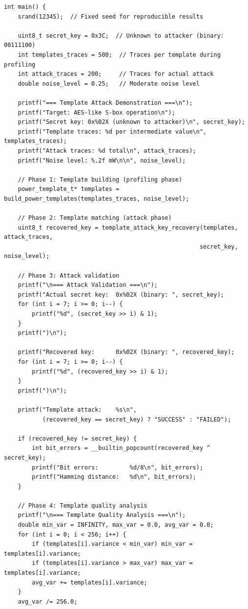 \documentclass[11pt,a4paper]{article}
\theoremstyle{definition}
\begin{document}
\begin{lstlisting}[caption={Complete Template Attack Demonstration}]
int main() {
    srand(12345);  // Fixed seed for reproducible results
    
    uint8_t secret_key = 0x3C;  // Unknown to attacker (binary: 00111100)
    int templates_traces = 500;  // Traces per template during profiling
    int attack_traces = 200;     // Traces for actual attack
    double noise_level = 0.25;   // Moderate noise level
    
    printf("=== Template Attack Demonstration ===\n");
    printf("Target: AES-like S-box operation\n");
    printf("Secret key: 0x%02X (unknown to attacker)\n", secret_key);
    printf("Template traces: %d per intermediate value\n", templates_traces);
    printf("Attack traces: %d total\n", attack_traces);
    printf("Noise level: %.2f mW\n\n", noise_level);
    
    // Phase 1: Template building (profiling phase)
    power_template_t* templates = build_power_templates(templates_traces, noise_level);
    
    // Phase 2: Template matching (attack phase)
    uint8_t recovered_key = template_attack_key_recovery(templates, attack_traces, 
                                                        secret_key, noise_level);
    
    // Phase 3: Attack validation
    printf("\n=== Attack Validation ===\n");
    printf("Actual secret key:  0x%02X (binary: ", secret_key);
    for (int i = 7; i >= 0; i--) {
        printf("%d", (secret_key >> i) & 1);
    }
    printf(")\n");
    
    printf("Recovered key:      0x%02X (binary: ", recovered_key);
    for (int i = 7; i >= 0; i--) {
        printf("%d", (recovered_key >> i) & 1);
    }
    printf(")\n");
    
    printf("Template attack:    %s\n", 
           (recovered_key == secret_key) ? "SUCCESS" : "FAILED");
    
    if (recovered_key != secret_key) {
        int bit_errors = __builtin_popcount(recovered_key ^ secret_key);
        printf("Bit errors:         %d/8\n", bit_errors);
        printf("Hamming distance:   %d\n", bit_errors);
    }
    
    // Phase 4: Template quality analysis
    printf("\n=== Template Quality Analysis ===\n");
    double min_var = INFINITY, max_var = 0.0, avg_var = 0.0;
    for (int i = 0; i < 256; i++) {
        if (templates[i].variance < min_var) min_var = templates[i].variance;
        if (templates[i].variance > max_var) max_var = templates[i].variance;
        avg_var += templates[i].variance;
    }
    avg_var /= 256.0;
    

\end{lstlisting}
\end{document}
